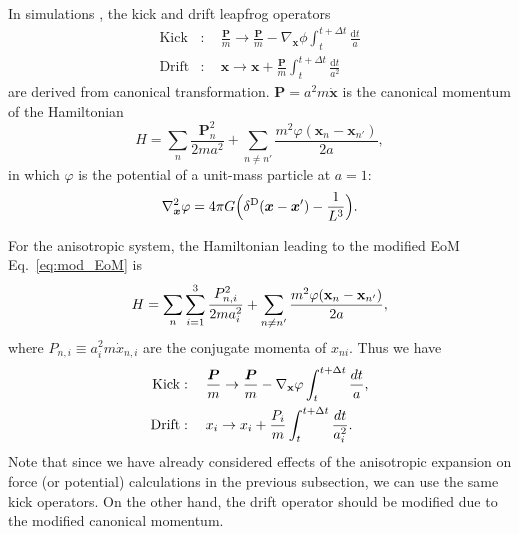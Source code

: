 \documentclass[a4paper,11pt]{article}
\DeclareMathOperator{\deltaD}{\delta^\mathrm{D}}
\renewcommand{\d}{\mathrm{d}}
\newcommand{\vr}{{\bm r}}
\newcommand{\vx}{{\bm x}}
\newcommand{\vP}{{\bm P}}
\begin{document}
In simulations \cite{QuinnKatzEtAl97, Springel05}, the kick and drift leapfrog
operators
\begin{align}
    \mathrm{Kick} &: \quad \frac{\vP}m \to \frac{\vP}m
        - \nabla_\vx \phi \int_t^{t+\Delta t} \frac{\d t}a  \\
    \mathrm{Drift} &: \quad \vx \to \vx
        + \frac{\vP}{m} \int_t^{t+\Delta t} \frac{\d t}{a^2}
\end{align}
are derived from canonical transformation.
$\vP = a^2 m \dot \vx$ is the canonical momentum of the Hamiltonian
\begin{equation}
    H = \sum_n \frac{\vP_n^2}{2 m a^2}
    + \sum_{n \neq n'} \frac{m^2 \varphi(\vx_n - \vx_{n'})}{2a},
\end{equation}
in which $\varphi$ is the potential of a unit-mass particle at $a=1$:
\begin{equation}
    \nabla_\vx^2 \varphi = 4\pi G \Bigl(\deltaD(\vx-\vx') - \frac1{L^3} \Bigr).
\end{equation}

For the anisotropic system,
the Hamiltonian leading to the modified EoM Eq.~\eqref{eq:mod_EoM} is
\begin{equation}
    H = \sum_n \sum_{i=1}^3 \frac{P_{n,i}^2}{2 m a_i^2}
    + \sum_{n \neq n'} \frac{m^2 \varphi({\bf x}_n - {\bf x}_{n'})}{2a},
\end{equation}
where $P_{n,i}\equiv a_i^2 m \dot x_{n,i}$ are the conjugate momenta of $x_{ni}$.
Thus we have
\begin{align}
    \mathrm{Kick} &: \quad \frac{\vP}m \to \frac{\vP}m
        - \nabla_{\bf x} \varphi \int_t^{t+\Delta t} \frac{d t}a,  \\
    \mathrm{Drift} &: \quad x_i \to x_i
        + \frac{P_i}{m} \int_t^{t+\Delta t} \frac{d t}{a_i^2}.
\end{align}
Note that since we have already considered effects of the anisotropic expansion 
on force (or potential) calculations in the previous subsection, we can use the same kick operators.
On the other hand, the drift operator should be modified due to the modified canonical momentum.

\end{document}
